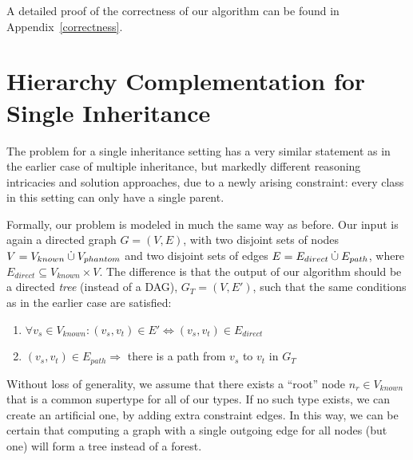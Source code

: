 A detailed proof of the correctness of our algorithm can be found in
Appendix~\ref{correctness}.



\section{Hierarchy Complementation for Single Inheritance}
\label{single}

The problem for a single inheritance setting has a very similar
statement as in the earlier case of multiple inheritance, but markedly
different reasoning intricacies and solution approaches, due to a newly
arising constraint: every class in this setting can only have a
single parent.

Formally, our problem is modeled in much the same way as before. Our
input is again a directed graph $G = (V,E)$, with two disjoint sets of
nodes $V = V_{known} \mathbin{\dot{\cup}} V_{phantom}$ and two disjoint sets of edges
$E = E_{direct} \mathbin{\dot{\cup}} E_{path}$, where $E_{direct} \subseteq V_{known}
\times V$.  The difference is that the output of our algorithm should
be a directed \emph{tree} (instead of a DAG), $G_T = (V,E')$, such
that the same conditions as in the earlier case are satisfied:
\begin{enumerate}
\item $\forall v_s \in V_{known}: (v_s,v_t) \in E' \Leftrightarrow (v_s,
 v_t) \in E_{direct}$
\item $(v_s,v_t) \in E_{path} \Rightarrow$ there is a path from $v_s$ to
$v_t$ in $G_T$
\end{enumerate}

Without loss of generality, we assume that there exists a ``root''
node $n_r \in V_{known}$ that is a common supertype for all of our
types. If no such type exists, we can create an artificial one, by
adding extra constraint edges. In this way, we can be certain that
computing a graph with a single outgoing edge for all nodes (but one)
will form a tree instead of a forest.


